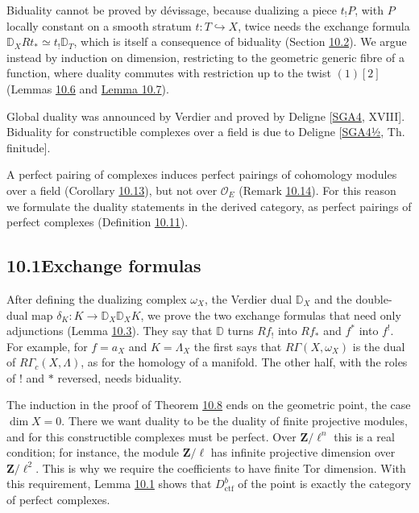 \documentclass[11pt]{article}
\begin{document}
Biduality cannot be proved by dévissage, because dualizing a piece \(t_!P\), with \(P\) locally constant on a smooth stratum \(t:T\hookrightarrow X\), twice needs the exchange formula \(\mathbb D_XRt_*\simeq t_!\mathbb D_T\), which is itself a consequence of biduality (Section \hyperref[bp112]{10.2}). We argue instead by induction on dimension, restricting to the geometric generic fibre of a function, where duality commutes with restriction up to the twist \((1)[2]\) (Lemmas \hyperref[bp119]{10.6} and \hyperref[bp122]{Lemma 10.7}).

Global duality was announced by Verdier and proved by Deligne [\hyperref[bp330]{SGA4}, XVIII]. Biduality for constructible complexes over a field is due to Deligne [\hyperref[bp331]{SGA4½}, Th. finitude].

A perfect pairing of complexes induces perfect pairings of cohomology modules over a field (Corollary \hyperref[bp140]{10.13}), but not over \(\mathcal O_E\) (Remark \hyperref[bp143]{10.14}). For this reason we formulate the duality statements in the derived category, as perfect pairings of perfect complexes (Definition \hyperref[bp135]{10.11}).

\subsection*{\texorpdfstring{10.1\quad Exchange formulas}{10.1 Exchange formulas}}
\label{bp103}%
\label{bp104}%
After defining the dualizing complex \(\omega_X\), the Verdier dual \(\mathbb D_X\) and the double-dual map \(\delta_K:K\to\mathbb D_X\mathbb D_XK\), we prove the two exchange formulas that need only adjunctions (Lemma \hyperref[bp110]{10.3}). They say that \(\mathbb D\) turns \(Rf_!\) into \(Rf_*\) and \(f^*\) into \(f^!\). For example, for \(f=a_X\) and \(K=\Lambda_X\) the first says that \(R\Gamma(X,\omega_X)\) is the dual of \(R\Gamma_c(X,\Lambda)\), as for the homology of a manifold. The other half, with the roles of \(!\) and \(*\) reversed, needs biduality.

The induction in the proof of Theorem \hyperref[bp125]{10.8} ends on the geometric point, the case \(\dim X=0\). There we want duality to be the duality of finite projective modules, and for this constructible complexes must be perfect. Over \(\mathbf Z/\ell^n\) this is a real condition; for instance, the module \(\mathbf Z/\ell\) has infinite projective dimension over \(\mathbf Z/\ell^2\). This is why we require the coefficients to have finite Tor dimension. With this requirement, Lemma \hyperref[bp105]{10.1} shows that \(D^b_{\mathrm{ctf}}\) of the point is exactly the category of perfect complexes.
\end{document}
